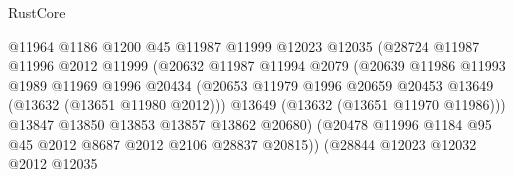 \begin{lexlean}{RustCore}
\begin{coremodule}
                                    @11964
                                    @1186
                                    @1200
                                    @45
                                    @11987
                                    @11999
                                    @12023
                                    @12035
                                    (@28724
                                      @11987
                                      @11996
                                      @2012
                                      @11999
                                      (@20632
                                        @11987
                                        @11994
                                        @2079
                                        (@20639
                                          @11986
                                          @11993
                                          @1989
                                          @11969
                                          @1996
                                          @20434
                                          (@20653
                                            @11979
                                            @1996
                                            @20659
                                            @20453
                                            @13649
                                            (@13632 (@13651 @11980 @2012)))
                                          @13649
                                          (@13632 (@13651 @11970 @11986)))
                                        @13847
                                        @13850
                                        @13853
                                        @13857
                                        @13862
                                        @20680)
                                      (@20478
                                        @11996
                                        @1184
                                        @95
                                        @45
                                        @2012
                                        @8687
                                        @2012
                                        @2106
                                        @28837
                                        @20815))
                                    (@28844
                                      @12023
                                      @12032
                                      @2012
                                      @12035

\end{coremodule}
\end{lexlean}
